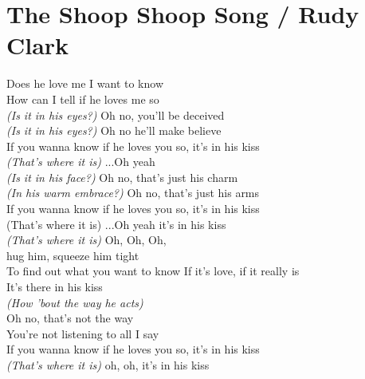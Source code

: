 \section{The Shoop Shoop Song / Rudy Clark}\label{sec:shoop_shoop_song}
\Cmajor
\Fmajor
\Gmajor
\Aminor
\Dminor
\Dseven
\Eseven


Does he love me I want to know\\
How can I tell if he loves me so\\
\emph{(Is it in his eyes?)} Oh no, you'll be deceived\\
\emph{(Is it in his eyes?)} Oh no he'll make believe\\
If you wanna know if he loves you so, it's in his kiss\\
\emph{(That's where it is)} ...Oh yeah\\
\emph{(Is it in his face?)} Oh no, that's just his charm\\
\emph{(In his warm embrace?)} Oh no, that's just his arms\\
If you wanna know if he loves you so, it's in his kiss \\
(That's where it is) ...Oh yeah it's in his kiss\\
\emph{(That's where it is)} Oh, Oh, Oh,\\
hug him, squeeze him tight\\
To find out what you want to know If it's love, if it really is\\
It's there in his kiss\\
\emph{(How 'bout the way he acts)}\\
Oh no, that's not the way\\
You're not listening to all I say\\
If you wanna know if he loves you so, it's in his kiss\\
\emph{(That's where it is)} oh, oh, it's in his kiss\\
